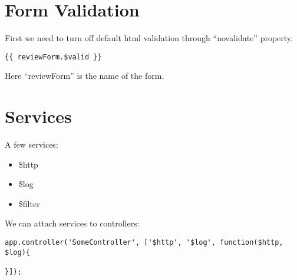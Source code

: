 \documentclass[a4paper, 12pt]{article}
\begin{document}
\section{Form Validation}
First we need to turn off default html validation through ``novalidate'' property.
\begin{verbatim}
{{ reviewForm.$valid }}
\end{verbatim}
Here ``reviewForm'' is the name of the form.

\section{Services}
A few services:
\begin{itemize}
	\item \$http
	\item \$log
	\item \$filter
\end{itemize}
We can attach services to controllers:
\begin{verbatim}
app.controller('SomeController', ['$http', '$log', function($http, $log){
	
}]);
\end{verbatim}
\end{document}
